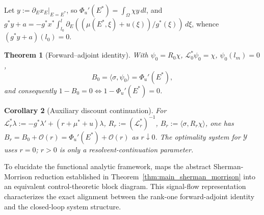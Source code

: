 \documentclass[a4paper,fleqn,longmktitle]{cas-sc}
\theoremstyle{plain}
\newtheorem{theorem}{Theorem}[section]
\newtheorem{corollary}[theorem]{Corollary}
\theoremstyle{definition}
\theoremstyle{remark}
\numberwithin{equation}{section}
\begin{document}
Let \(y:=\partial_E x_E|_{E=E^*}\), so
\(\Phi_u'(E^*)=\int_\Omega\chi y\,dl\), and
\(g^*y+a=-g^*x^*\int_{l_0}^{l}\partial_E((\mu(E^*,\xi)+u(\xi))/g^*(\xi))\,d\xi\),
whence \((g^*y+a)(l_0)=0\).
\begin{theorem}[Forward--adjoint identity]
\label{thm:main_forward_adjoint_identity}
With \(\psi_0=R_0\chi\), \(\mathcal L_0^*\psi_0=\chi\), \(\psi_0(l_m)=0\),
\[
    B_0
    =
    \langle\sigma,\psi_0\rangle
    =
    \Phi_u'(E^*),
\]
and consequently \(1-B_0=0\iff1-\Phi_u'(E^*)=0\).
\end{theorem}
\begin{corollary}[Auxiliary discount continuation]
\label{cor:main_discount_continuation}
For \(\mathcal L_r^*\lambda:=-g^*\lambda'+(r+\mu^*+u)\lambda\),
\(R_r:=(\mathcal L_r^*)^{-1}\), \(B_r:=\langle\sigma,R_r\chi\rangle\), one has
\(B_r=B_0+\mathcal O(r)=\Phi_u'(E^*)+\mathcal O(r)\) as \(r\downarrow0\). The optimality system
for \(\mathcal Y\) uses \(r=0\); \(r>0\) is only a resolvent-continuation
parameter.
\end{corollary}

To elucidate the functional analytic framework,  maps the abstract Sherman-Morrison reduction established in Theorem~\ref{thm:main_sherman_morrison} into an equivalent control-theoretic block diagram. This signal-flow representation characterizes the exact alignment between the rank-one forward-adjoint identity and the closed-loop system structure.
\end{document}

